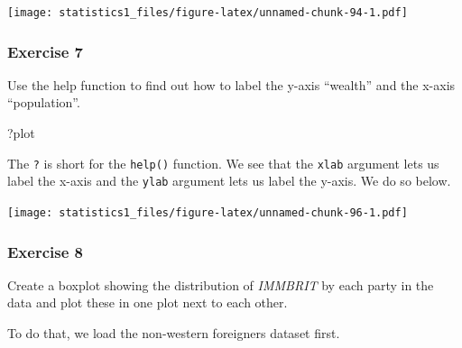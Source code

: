 \documentclass[]{article}
\newenvironment{Shaded}{\begin{snugshade}}{\end{snugshade}}
\newcommand{\KeywordTok}[1]{\textcolor[rgb]{0.13,0.29,0.53}{\textbf{#1}}}
\newcommand{\DataTypeTok}[1]{\textcolor[rgb]{0.13,0.29,0.53}{#1}}
\newcommand{\StringTok}[1]{\textcolor[rgb]{0.31,0.60,0.02}{#1}}
\newcommand{\CommentTok}[1]{\textcolor[rgb]{0.56,0.35,0.01}{\textit{#1}}}
\newcommand{\OperatorTok}[1]{\textcolor[rgb]{0.81,0.36,0.00}{\textbf{#1}}}
\newcommand{\NormalTok}[1]{#1}
\theoremstyle{definition}
\theoremstyle{definition}
\theoremstyle{definition}
\theoremstyle{remark}
\begin{document}
\texttt{[image: statistics1\_files/figure-latex/unnamed-chunk-94-1.pdf]}

\subsubsection{Exercise 7}\label{exercise-7-1}

Use the help function to find out how to label the y-axis ``wealth'' and
the x-axis ``population''.

\begin{Shaded}
\begin{Highlighting}[]
\NormalTok{?plot}
\end{Highlighting}
\end{Shaded}

The \texttt{?} is short for the \texttt{help()} function. We see that
the \texttt{xlab} argument lets us label the x-axis and the
\texttt{ylab} argument lets us label the y-axis. We do so below.

\begin{Shaded}
\end{Shaded}

\texttt{[image: statistics1\_files/figure-latex/unnamed-chunk-96-1.pdf]}

\subsubsection{Exercise 8}\label{exercise-8-1}

Create a boxplot showing the distribution of \emph{IMMBRIT} by each
party in the data and plot these in one plot next to each other.

To do that, we load the non-western foreigners dataset first.
\end{document}
